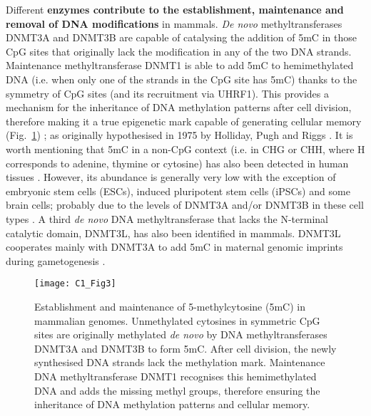 \bigskip

Different \textbf{enzymes contribute to the establishment, maintenance and removal of DNA modifications} in mammals. \textit{De novo} methyltransferases DNMT3A and DNMT3B are capable of catalysing the addition of 5mC in those CpG sites that originally lack the modification in any of the two DNA strands. Maintenance methyltransferase DNMT1 is able to add 5mC to hemimethylated DNA (i.e. when only one of the strands in the CpG site has 5mC) thanks to the symmetry of CpG sites (and its recruitment via UHRF1). This provides a mechanism for the inheritance of DNA methylation patterns after cell division, therefore making it a true epigenetic mark capable of generating cellular memory (Fig.~\ref{fig:c1_fig3}) \citep{Li2014,Smith2013}; as originally hypothesised in 1975 by Holliday, Pugh and Riggs \citep{Holliday1975,Riggs1975}. It is worth mentioning that 5mC in a non-CpG context (i.e. in \acrshort{CHG} or \acrshort{CHH}, where H corresponds to adenine, thymine or cytosine) has also been detected in human tissues \citep{Schultz2015}. However, its abundance is generally very low with the exception of embryonic stem cells (\acrshort{ESCs}), induced pluripotent stem cells (\acrshort{iPSCs}) and some brain cells; probably due to the levels of DNMT3A and/or DNMT3B in these cell types \citep{Ziller2011,He2015}. A third \textit{de novo} DNA methyltransferase that lacks the N-terminal catalytic domain, DNMT3L, has also been identified in mammals. DNMT3L cooperates mainly with DNMT3A to add 5mC in maternal genomic imprints during gametogenesis \citep{Bourchis2001,Tomida2018}.

\begin{figure}[htbp!] 
	\centering    
	\texttt{[image: C1\_Fig3]}
	\vspace*{1 mm}
	\caption[Establishment and maintenance of 5-methylcytosine in mammalian genomes]{Establishment and maintenance of 5-methylcytosine (\acrshort{5mC}) in mammalian genomes. Unmethylated cytosines in symmetric CpG sites are originally methylated \textit{de novo} by DNA methyltransferases DNMT3A and DNMT3B to form \acrshort{5mC}. After cell division, the newly synthesised DNA strands lack the methylation mark. Maintenance DNA methyltransferase DNMT1 recognises this hemimethylated DNA and adds the missing methyl groups, therefore ensuring the inheritance of DNA methylation patterns and cellular memory.}
	\label{fig:c1_fig3}
\end{figure}

\bigskip

